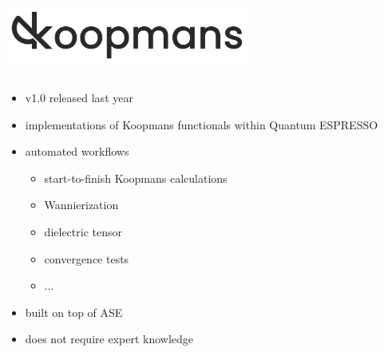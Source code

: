 \documentclass[xcolor=table,aspectratio=169]{beamer}
\numberwithin{equation}{section}
\begin{document}
\begin{frame}{}
   \vspace{-1ex}
   \begin{center}
      \includegraphics[width=0.6\textwidth]{logos/koopmans_grey_on_transparent.png}
   \end{center}

   \vspace{-2ex}

   \begin{columns}
      \begin{column}{0.55\textwidth}
         \begin{itemize}
            \item v1.0 released last year\footnotemark[1]
            \item implementations of Koopmans functionals within Quantum ESPRESSO
            \item automated workflows
                  \begin{itemize}
                     \item start-to-finish Koopmans calculations
                     \item Wannierization
                     \item dielectric tensor
                     \item convergence tests
                     \item ...
                  \end{itemize}
            \item built on top of ASE\footnotemark[2]
            \item does not require expert knowledge
         \end{itemize}
      \end{column}


\end{columns}
\end{frame}
\end{document}
